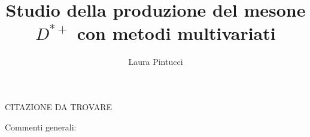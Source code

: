 \documentclass[a4paper, twoside]{report}
\title{Studio della produzione del mesone $D^{*+}$ con metodi multivariati}
\author{Laura Pintucci}
\begin{document}

\thispagestyle{empty} 
\cleardoublepage


\thispagestyle{empty} 
\begin{flushright}%
\null {}

CITAZIONE DA TROVARE

\null
\end{flushright}





 


\tableofcontents
Commenti generali: 












\end{document}
